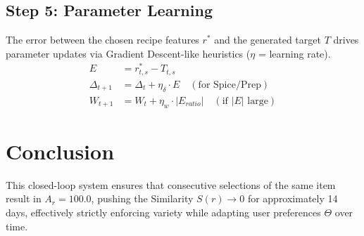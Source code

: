 \documentclass{article}
\begin{document}
\subsection{Step 5: Parameter Learning}
The error between the chosen recipe features $r^*$ and the generated target $T$ drives parameter updates via Gradient Descent-like heuristics ($\eta$ = learning rate).
\begin{align}
E &= r^*_{t,s} - T_{t,s} \\
\Delta_{t+1} &= \Delta_t + \eta_\delta \cdot E \quad (\text{for Spice/Prep}) \\
W_{t+1} &= W_t + \eta_w \cdot |E_{ratio}| \quad (\text{if } |E| \text{ large})
\end{align}

\section{Conclusion}
This closed-loop system ensures that consecutive selections of the same item result in $A_r=100.0$, pushing the Similarity $S(r) \to 0$ for approximately 14 days, effectively strictly enforcing variety while adapting user preferences $\Theta$ over time.
\end{document}
